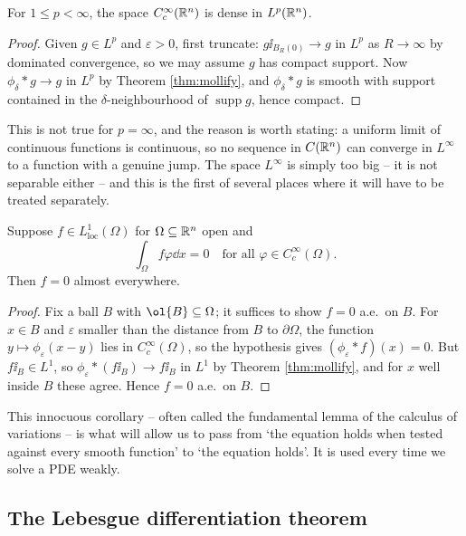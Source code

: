 \documentclass[a4paper]{scrartcl}
\DeclareMathOperator{\supp}{supp}
\begin{document}
\begin{corollary}\label{cor:ccinftydense}
	For $1 \le p < \infty$, the space $C_c^\infty(\mathbb{R}^n)$ is dense in $L^p(\mathbb{R}^n)$.
\end{corollary}

\begin{proof}
	Given $g \in L^p$ and $\varepsilon > 0$, first truncate: $g \ii_{B_R(0)} \to g$ in $L^p$ as $R \to \infty$ by dominated convergence, so we may assume $g$ has compact support. Now $\phi_\delta * g \to g$ in $L^p$ by Theorem \ref{thm:mollify}, and $\phi_\delta * g$ is smooth with support contained in the $\delta$-neighbourhood of $\supp g$, hence compact.
\end{proof}

This is not true for $p = \infty$, and the reason is worth stating: a uniform limit of continuous functions is continuous, so no sequence in $C(\mathbb{R}^n)$ can converge in $L^\infty$ to a function with a genuine jump. The space $L^\infty$ is simply too big -- it is not separable either -- and this is the first of several places where it will have to be treated separately.

\begin{corollary}\label{cor:duboisreymond}
	Suppose $f \in L^1_{\mathrm{loc}}(\Omega)$ for $\Omega \subseteq \mathbb{R}^n$ open and
	$$\int_\Omega f \varphi \dd x = 0 \quad \text{for all } \varphi \in C_c^\infty(\Omega).$$
	Then $f = 0$ almost everywhere.
\end{corollary}

\begin{proof}
	Fix a ball $B$ with $\ol{B} \subseteq \Omega$; it suffices to show $f = 0$ a.e.\ on $B$. For $x \in B$ and $\varepsilon$ smaller than the distance from $B$ to $\partial \Omega$, the function $y \mapsto \phi_\varepsilon(x - y)$ lies in $C_c^\infty(\Omega)$, so the hypothesis gives $(\phi_\varepsilon * f)(x) = 0$. But $f \ii_B \in L^1$, so $\phi_\varepsilon * (f \ii_B) \to f\ii_B$ in $L^1$ by Theorem \ref{thm:mollify}, and for $x$ well inside $B$ these agree. Hence $f = 0$ a.e.\ on $B$.
\end{proof}

This innocuous corollary -- often called the fundamental lemma of the calculus of variations -- is what will allow us to pass from `the equation holds when tested against every smooth function' to `the equation holds'. It is used every time we solve a PDE weakly.

\subsection{The Lebesgue differentiation theorem}
\end{document}
